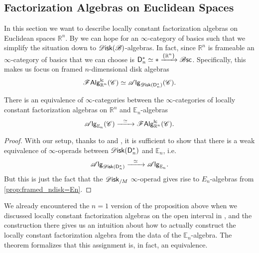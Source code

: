 \documentclass[../text]{subfiles}
\begin{document}
\subsection{Factorization Algebras on Euclidean Spaces}\label{ssec:lcfa_on_Rn}

In this section we want to describe locally constant factorization algebras on Euclidean spaces $\mathbb{R}^n$. By  we can hope for an $\infty$-category of basics such that we simplify the situation down to $\disk (\bstr)$-algebras. In fact, since $\mathbb{R}^n$ is frameable an $\infty$-category of basics that we can choose is $\mathsf{D}_n^* \simeq * \xrightarrow{\{ \mathbb{R}^n\}} \mathscr{B} \mathsf{sc}$. Specifically, this makes us focus on framed $n$-dimensional disk algebras
%
\begin{equation}
    \lcfa_{\mathbb{R}^n} (\catC) \simeq \alg{\disk (\mathsf{D}_n^*)} (\catC).
\end{equation}
%

\begin{theorem}
    There is an equivalence of $\infty$-categories between the $\infty$-categories of locally constant factorization algebras on $\mathbb{R}^n$ and $\mathbb{E}_n$-algebras
    \begin{equation}
        \alg{\mathbb{E}_n} (\catC) \xrightarrow{\ \ \simeq \ \ } \lcfa_{\mathbb{R}^n} (\catC).
    \end{equation}
\end{theorem}

\begin{proof}
    With our setup, thanks to  and , it is sufficient to show that there is a weak equivalence of $\infty$-operads between $\disk (\mathsf{D}_n^*)$ and $\mathbb{E}_n$, i.e.
    \begin{equation}
        \alg{\disk (\mathsf{D}_n^*)} \xrightarrow{\ \ \simeq \ \ } \alg{\mathbb{E}_n}.
    \end{equation}
    But this is just the fact that the $\disk_{/M}$ $\infty$-operad gives rise to $E_n$-algebras from \cref{prop:framed_ndisk=En}.
\end{proof}

\begin{remark}
    We already encountered the $n=1$ version of the proposition above when we discussed locally constant factorization algebras on the open interval in , and the construction there gives us an intuition about how to actually construct the locally constant factorization algebra from the data of the $\mathbb{E}_n$-algebra. The theorem formalizes that this assignment is, in fact, an equivalence.
\end{remark}
\end{document}
